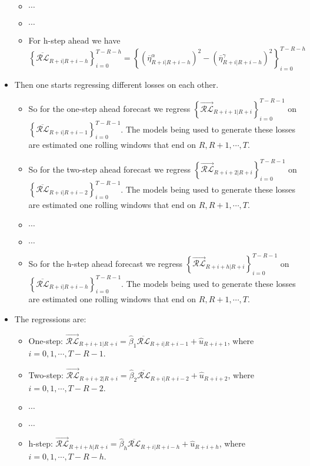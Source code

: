 \documentclass[11pt]{article}
\begin{document}
\begin{itemize}
\begin{itemize}
\item $\cdots$
\item $\cdots$
\item For h-step ahead we have $\left\{\overline{\mathcal{RL}}_{R+i|R+i-h}\right\}_{i=0}^{T-R-h}\!\!\!\!=\left\{\left(\overline{\eta}^{\alpha}_{R+i|R+i-h}\right)^{2}\!\!-\left(\overline{\eta}^{\gamma}_{R+i|R+i-h}\right)^{2}\right\}_{i=0}^{T-R-h}$
\end{itemize}
\item Then one starts regressing different losses on each other.
\begin{itemize}
\item So for the one-step ahead forecast we regress $\left\{\overrightarrow{\mathcal{RL}}_{R+i+1|R+i}\right\}_{i=0}^{T-R-1}$ on $\left\{\overline{\mathcal{RL}}_{R+i|R+i-1}\right\}_{i=0}^{T-R-1}$.  The models being used to generate these losses are estimated one rolling windows that end on $R, R+1, \cdots, T$.
\item So for the two-step ahead forecast we regress $\left\{\overrightarrow{\mathcal{RL}}_{R+i+2|R+i}\right\}_{i=0}^{T-R-1}$ on $\left\{\overline{\mathcal{RL}}_{R+i|R+i-2}\right\}_{i=0}^{T-R-1}$.  The models being used to generate these losses are estimated one rolling windows that end on $R, R+1, \cdots, T$.
\item $\cdots$
\item $\cdots$
\item So for the h-step ahead forecast we regress $\left\{\overrightarrow{\mathcal{RL}}_{R+i+h|R+i}\right\}_{i=0}^{T-R-1}$ on $\left\{\overline{\mathcal{RL}}_{R+i|R+i-h}\right\}_{i=0}^{T-R-1}$.  The models being used to generate these losses are estimated one rolling windows that end on $R, R+1, \cdots, T$.
\end{itemize}
\item The regressions are:
\begin{itemize}
\item One-step: $\overrightarrow{\mathcal{RL}}_{R+i+1|R+i}=\widehat{\beta}_{1}\overline{\mathcal{RL}}_{R+i|R+i-1}+\widehat{u}_{R+i+1}$, where $i=0, 1, \cdots, T-R-1$.
\item Two-step: $\overrightarrow{\mathcal{RL}}_{R+i+2|R+i}=\widehat{\beta}_{2}\overline{\mathcal{RL}}_{R+i|R+i-2}+\widehat{u}_{R+i+2}$, where $i=0, 1, \cdots, T-R-2$.
\item $\cdots$
\item $\cdots$
\item h-step: $\overrightarrow{\mathcal{RL}}_{R+i+h|R+i}=\widehat{\beta}_{h}\overline{\mathcal{RL}}_{R+i|R+i-h}+\widehat{u}_{R+i+h}$, where $i=0, 1, \cdots, T-R-h$.

\end{itemize}
\end{itemize}
\end{document}
